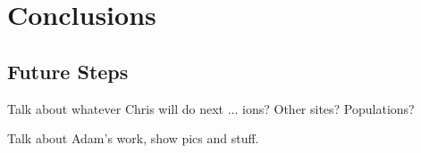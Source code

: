 \chapter{Conclusions}

\section{Future Steps}

Talk about whatever Chris will do next ... ions?  Other sites?  Populations?

Talk about Adam's work, show pics and stuff.